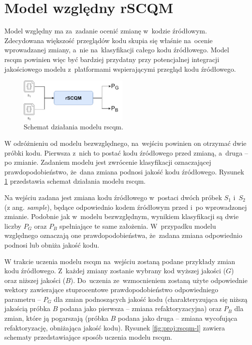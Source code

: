 \documentclass[twoside]{praca}
\begin{document}
\section{Model względny rSCQM}
\label{sec:proj:wz}
Model względny ma za~zadanie ocenić zmianę w~kodzie źródłowym. 
Zdecydowana większość przeglądów kodu skupia się właśnie na~ocenie wprowadzanej zmiany, a~nie na~klasyfikacji całego kodu źródłowego. Model \gls{rscqm} powinien więc być bardziej przydatny przy potencjalnej integracji jakościowego modelu z~platformami wspierającymi przegląd kodu źródłowego.

\begin{figure}
\centering
\includegraphics[width=0.48\textwidth]{proj/rscqm-ss.png}
\caption{Schemat działania modelu \gls{rscqm}.}
\label{fig:proj:rscqm-ss}
\end{figure}

W odróżnieniu od modelu bezwzględnego, na~wejściu powinien on otrzymać dwie próbki kodu. Pierwsza z~nich to postać kodu źródłowego przed zmianą, a~druga -- po zmianie. Zadaniem modelu jest zwrócenie klasyfikacji oznaczającej prawdopodobieństwo, że~dana zmiana podnosi jakość kodu źródłowego. Rysunek \ref{fig:proj:rscqm-ss} przedstawia schemat działania modelu \gls{rscqm}. 

Na wejściu zadana jest zmiana kodu źródłowego w~postaci dwóch próbek $S_1$ i~$S_2$ (z ang. \textit{sample}), będące odpowiednio kodem źródłowym przed i~po wprowadzonej zmianie. Podobnie jak w~modelu bezwzględnym, wynikiem klasyfikacji są dwie liczby $P_G$ oraz $P_B$ spełniające te same założenia. W~przypadku modelu względnego oznaczają one prawdopodobieństwa, że~zadana zmiana odpowiednio podnosi lub obniża jakość kodu.


W trakcie uczenia modelu \gls{rscqm} na~wejściu zostaną podane przykłady zmian kodu źródłowego. Z~każdej zmiany zostanie wybrany kod wyższej jakości ($G$) oraz niższej jakości ($B$). Do~uczenia ze~wzmocnieniem zostaną użyte odpowiednie wektory zawierające stuprocentowe prawdopodobieństwo odpowiedniego parametru -- $P_G$ dla zmian podnoszących jakość kodu (charakteryzująca się niższą jakością próbka $B$ podana jako pierwsza -- zmiana refaktoryzacyjna) oraz $P_B$ dla zmian, które ją pogarszają (próbka $B$ podana jako druga -- zmiana wycofująca refaktoryzację, obniżająca jakość kodu). Rysunek \ref{fig:proj:rscqm-l} zawiera schematy przedstawiające sposób uczenia modelu \gls{rscqm}.
\end{document}
